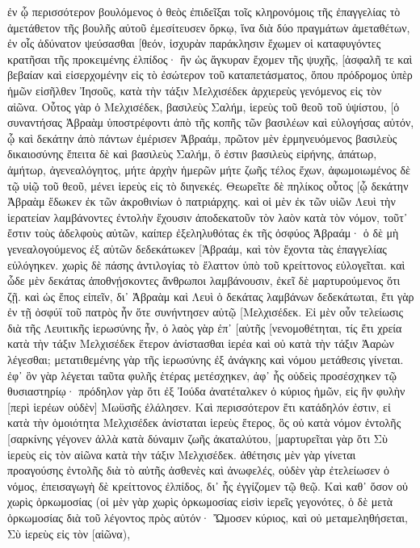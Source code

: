 ἐν ᾧ περισσότερον βουλόμενος ὁ θεὸς ἐπιδεῖξαι τοῖς κληρονόμοις τῆς ἐπαγγελίας τὸ ἀμετάθετον τῆς βουλῆς αὐτοῦ ἐμεσίτευσεν ὅρκῳ, 
ἵνα διὰ δύο πραγμάτων ἀμεταθέτων, ἐν οἷς ἀδύνατον ψεύσασθαι [θεόν, ἰσχυρὰν παράκλησιν ἔχωμεν οἱ καταφυγόντες κρατῆσαι τῆς προκειμένης ἐλπίδος· 
ἣν ὡς ἄγκυραν ἔχομεν τῆς ψυχῆς, [ἀσφαλῆ τε καὶ βεβαίαν καὶ εἰσερχομένην εἰς τὸ ἐσώτερον τοῦ καταπετάσματος, 
ὅπου πρόδρομος ὑπὲρ ἡμῶν εἰσῆλθεν Ἰησοῦς, κατὰ τὴν τάξιν Μελχισέδεκ ἀρχιερεὺς γενόμενος εἰς τὸν αἰῶνα. 
Οὗτος γὰρ ὁ Μελχισέδεκ, βασιλεὺς Σαλήμ, ἱερεὺς τοῦ θεοῦ τοῦ ὑψίστου, [ὁ συναντήσας Ἀβραὰμ ὑποστρέφοντι ἀπὸ τῆς κοπῆς τῶν βασιλέων καὶ εὐλογήσας αὐτόν, 
ᾧ καὶ δεκάτην ἀπὸ πάντων ἐμέρισεν Ἀβραάμ, πρῶτον μὲν ἑρμηνευόμενος βασιλεὺς δικαιοσύνης ἔπειτα δὲ καὶ βασιλεὺς Σαλήμ, ὅ ἐστιν βασιλεὺς εἰρήνης, 
ἀπάτωρ, ἀμήτωρ, ἀγενεαλόγητος, μήτε ἀρχὴν ἡμερῶν μήτε ζωῆς τέλος ἔχων, ἀφωμοιωμένος δὲ τῷ υἱῷ τοῦ θεοῦ, μένει ἱερεὺς εἰς τὸ διηνεκές. 
Θεωρεῖτε δὲ πηλίκος οὗτος [ᾧ δεκάτην Ἀβραὰμ ἔδωκεν ἐκ τῶν ἀκροθινίων ὁ πατριάρχης. 
καὶ οἱ μὲν ἐκ τῶν υἱῶν Λευὶ τὴν ἱερατείαν λαμβάνοντες ἐντολὴν ἔχουσιν ἀποδεκατοῦν τὸν λαὸν κατὰ τὸν νόμον, τοῦτ᾽ ἔστιν τοὺς ἀδελφοὺς αὐτῶν, καίπερ ἐξεληλυθότας ἐκ τῆς ὀσφύος Ἀβραάμ· 
ὁ δὲ μὴ γενεαλογούμενος ἐξ αὐτῶν δεδεκάτωκεν [Ἀβραάμ, καὶ τὸν ἔχοντα τὰς ἐπαγγελίας εὐλόγηκεν. 
χωρὶς δὲ πάσης ἀντιλογίας τὸ ἔλαττον ὑπὸ τοῦ κρείττονος εὐλογεῖται. 
καὶ ὧδε μὲν δεκάτας ἀποθνῄσκοντες ἄνθρωποι λαμβάνουσιν, ἐκεῖ δὲ μαρτυρούμενος ὅτι ζῇ. 
καὶ ὡς ἔπος εἰπεῖν, δι᾽ Ἀβραὰμ καὶ Λευὶ ὁ δεκάτας λαμβάνων δεδεκάτωται, 
ἔτι γὰρ ἐν τῇ ὀσφύϊ τοῦ πατρὸς ἦν ὅτε συνήντησεν αὐτῷ [Μελχισέδεκ. 
Εἰ μὲν οὖν τελείωσις διὰ τῆς Λευιτικῆς ἱερωσύνης ἦν, ὁ λαὸς γὰρ ἐπ᾽ [αὐτῆς [νενομοθέτηται, τίς ἔτι χρεία κατὰ τὴν τάξιν Μελχισέδεκ ἕτερον ἀνίστασθαι ἱερέα καὶ οὐ κατὰ τὴν τάξιν Ἀαρὼν λέγεσθαι; 
μετατιθεμένης γὰρ τῆς ἱερωσύνης ἐξ ἀνάγκης καὶ νόμου μετάθεσις γίνεται. 
ἐφ᾽ ὃν γὰρ λέγεται ταῦτα φυλῆς ἑτέρας μετέσχηκεν, ἀφ᾽ ἧς οὐδεὶς προσέσχηκεν τῷ θυσιαστηρίῳ· 
πρόδηλον γὰρ ὅτι ἐξ Ἰούδα ἀνατέταλκεν ὁ κύριος ἡμῶν, εἰς ἣν φυλὴν [περὶ ἱερέων οὐδὲν] Μωϋσῆς ἐλάλησεν. 
Καὶ περισσότερον ἔτι κατάδηλόν ἐστιν, εἰ κατὰ τὴν ὁμοιότητα Μελχισέδεκ ἀνίσταται ἱερεὺς ἕτερος, 
ὃς οὐ κατὰ νόμον ἐντολῆς [σαρκίνης γέγονεν ἀλλὰ κατὰ δύναμιν ζωῆς ἀκαταλύτου, 
[μαρτυρεῖται γὰρ ὅτι Σὺ ἱερεὺς εἰς τὸν αἰῶνα κατὰ τὴν τάξιν Μελχισέδεκ. 
ἀθέτησις μὲν γὰρ γίνεται προαγούσης ἐντολῆς διὰ τὸ αὐτῆς ἀσθενὲς καὶ ἀνωφελές, 
οὐδὲν γὰρ ἐτελείωσεν ὁ νόμος, ἐπεισαγωγὴ δὲ κρείττονος ἐλπίδος, δι᾽ ἧς ἐγγίζομεν τῷ θεῷ. 
Καὶ καθ᾽ ὅσον οὐ χωρὶς ὁρκωμοσίας (οἱ μὲν γὰρ χωρὶς ὁρκωμοσίας εἰσὶν ἱερεῖς γεγονότες, 
ὁ δὲ μετὰ ὁρκωμοσίας διὰ τοῦ λέγοντος πρὸς αὐτόν· Ὤμοσεν κύριος, καὶ οὐ μεταμεληθήσεται, Σὺ ἱερεὺς εἰς τὸν [αἰῶνα), 

